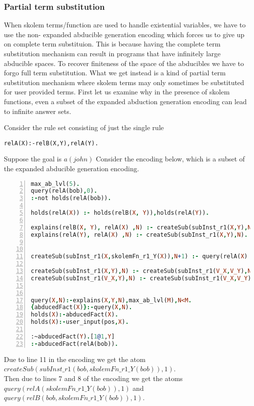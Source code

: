 \documentclass[sigconf]{acmart}
\begin{document}
\subsubsection{Partial term substitution}

When skolem terms/function are used to handle existential variables, we have
to use the non- expanded abducible generation encoding which forces us to give
up on complete term substituion.  This is because having the complete term
substitution mechanism can result in programs that have infinitely large
abducible spaces. To recover finiteness of the space of the abducibles we have
to forgo full term substitution. What we get instead is a kind of partial term
substitution mechanism where skolem terms may only sometimes be substituted
for user provided terms.  First let us examine why in the presence of skolem
functions, even a subset of the expanded abduction generation encoding can
lead to infinite answer sets.

Consider the rule set consisting of just the single rule 
\begin{verbatim}
relA(X):-relB(X,Y),relA(Y).
\end{verbatim}

Suppose the goal is $a(john)$
Consider the encoding below, which is a subset of the expanded abducible generation encoding.
\begin{lstlisting}[language=Prolog, numbers=left]
max_ab_lvl(5).
query(relA(bob),0).
:-not holds(relA(bob)).

holds(relA(X)) :- holds(relB(X, Y)),holds(relA(Y)).

explains(relB(X, Y), relA(X) ,N) :- createSub(subInst_r1(X,Y),N).
explains(relA(Y), relA(X) ,N) :- createSub(subInst_r1(X,Y),N).


createSub(subInst_r1(X,skolemFn_r1_Y(X)),N+1) :- query(relA(X) ,N),max_ab_lvl(M),N<M-1.

createSub(subInst_r1(X,Y),N) :- createSub(subInst_r1(V_X,V_Y),N), holds(relB(X, Y)).
createSub(subInst_r1(V_X,Y),N) :- createSub(subInst_r1(V_X,V_Y),N),holds(relA(Y)).


query(X,N):-explains(X,Y,N),max_ab_lvl(M),N<M.
{abducedFact(X)}:-query(X,N).
holds(X):-abducedFact(X).
holds(X):-user_input(pos,X).

:~abducedFact(Y).[1@1,Y]
:-abducedFact(relA(bob)).
\end{lstlisting}

Due to line 11 in the encoding we get the atom $createSub(subInst\_r1(bob,skolemFn\_r1\_Y(bob)),1)$.\\
Then due to lines 7 and 8 of the encoding we get the atoms $query(relA(skolemFn\_r1\_Y(bob)),1)$ and $query(relB(bob,skolemFn\_r1\_Y(bob)),1)$.\\
\end{document}
